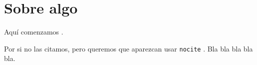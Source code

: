 \chapter{Sobre algo} %
\label{cap:algo}

Aquí comenzamos \citep{Reference3}.

Por si no las citamos, pero queremos que aparezcan usar \texttt{nocite} \nocite{Reference1}.  Bla bla bla bla bla.
